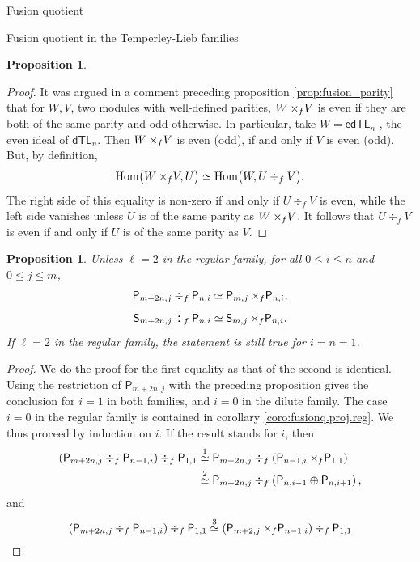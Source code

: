 \documentclass[reqno]{amsart}
\newtheorem{Prop}[Thm]{Proposition}
\newcommand{\dtl}[1]{\mathsf{dTL}_{#1}}
\newcommand{\edtl}[1]{\mathsf{edTL}_{#1}}
\newcommand{\ds}[1]{\mathsf S_{#1}}
\newcommand{\dP}[1]{\mathsf P_{#1}}
\newcommand{\xf}{\times\hspace{-0.27em}_f}
\newcommand{\Hom}[1]{\text{\rm{Hom}}\big( #1 \big)}
\begin{document}
\begin{section}{Fusion quotient}
\begin{subsection}{Fusion quotient in the Temperley-Lieb families}
\begin{Prop}
\end{Prop}
\begin{proof}
It was argued in a comment preceding proposition \ref{prop:fusion_parity} that for $W,V$, two modules with well-defined parities, $W\xf V$ is even if they are both of the same parity and odd otherwise. In particular, take $W = \edtl{n}$ , the even ideal of $\dtl{n}$. Then $W \xf V$ is even (odd), if and only if $V$ is even (odd). But, by definition, 
\begin{equation*}
\Hom{W\xf  V, U} \simeq \Hom{W,U \div_{f} V}.
\end{equation*}
The right side of this equality is non-zero if and only if $U \div_{f} V$ is even, while the left side vanishes unless $U$ is of the same parity as $W \xf V$. It follows that $U \div_{f} V$ is even if and only if $U$ is of the same parity as $V$.
\end{proof}
\begin{Prop}\label{prop:fusionq.proj}
Unless $\ell =2$ in the regular family, for all $0\leq i \leq n$ and $0\leq j \leq m$,
\begin{equation}\label{eq:fusionq.proj}
\dP{m+2n,j} \div_{f} \dP{n,i} \simeq \dP{m,j} \xf \dP{n,i},
\end{equation}
\begin{equation}
\ds{m+2n,j} \div_{f} \dP{n,i} \simeq \ds{m,j} \xf \dP{n,i}.
\end{equation}
If $\ell =2$ in the regular family, the statement is still true for $i=n=1$.
\end{Prop}
\begin{proof}
We do the proof for the first equality as that of the second is identical. Using the restriction of $\dP{m+2n,j}$ with the preceding proposition gives the conclusion for $i=1$ in both families, and $i=0$ in the dilute family. The case $i=0$ in the regular family is contained in corollary \ref{coro:fusionq.proj.reg}. We thus proceed by induction on $i$. If the result stands for $i$, then
\begin{align*}
	\left(\dP{m+2n,j}\div_{f} \dP{n-1,i}\right) \div_{f} \dP{1,1} & \overset{1}{\simeq} \dP{m+2n,j} \div_{f} \left(\dP{n-1,i} \xf \dP{1,1} \right)\\
	& \overset{2}{\simeq} \dP{m+2n,j} \div_{f} \left(\dP{n,i-1} \oplus \dP{n,i+1} \right),
\end{align*}
and
\begin{align*}
	\left(\dP{m+2n,j}\div_{f} \dP{n-1,i}\right) \div_{f} \dP{1,1} & \overset{3}{\simeq} \left(\dP{m+2,j} \xf \dP{n-1,i} \right)\div_{f} \dP{1,1}\\

\end{align*}
\end{proof}
\end{subsection}
\end{section}
\end{document}
